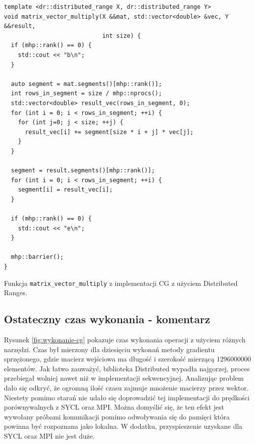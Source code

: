 \documentclass[a4paper,12pt]{book} %
\begin{document}
\begin{lstfloat}
\lstset{language=C++}
\begin{lstlisting}[frame=single]
template <dr::distributed_range X, dr::distributed_range Y>
void matrix_vector_multiply(X &&mat, std::vector<double> &vec, Y &&result,
                            int size) {
  if (mhp::rank() == 0) {
    std::cout << "b\n";
  }

  auto segment = mat.segments()[mhp::rank()];
  int rows_in_segment = size / mhp::nprocs();
  std::vector<double> result_vec(rows_in_segment, 0);
  for (int i = 0; i < rows_in_segment; ++i) {
    for (int j=0; j < size; ++j) {
      result_vec[i] += segment[size * i + j] * vec[j];
    }
  }

  segment = result.segments()[mhp::rank()];
  for (int i = 0; i < rows_in_segment; ++i) {
    segment[i] = result_vec[i];
  }

  if (mhp::rank() == 0) {
    std::cout << "e\n";
  }

  mhp::barrier();
}

\end{lstlisting}
\caption{Funkcja \texttt{matrix\_vector\_multiply} z implementacji CG z użyciem Distributed Ranges.}
\label{lst:dist-ranges-mat-vec}
\end{lstfloat}

\subsection{Ostateczny czas wykonania - komentarz}
Rysunek \ref{fig:wykonanie-cg} pokazuje czas wykonania operacji z użyciem różnych narzędzi. Czas był mierzony dla dziesięciu wykonań metody gradientu sprzężonego, gdzie macierz wejściowa ma długość i szerokość mierzącą $1296000000$ elementów. Jak łatwo zauważyć, biblioteka Distributed wypadła najgorzej, proces przebiegał wolniej nawet niż w implementacji sekwencyjnej. Analizując problem dało się odkryć, że ogromną ilość czasu zajmuje mnożenie macierzy przez wektor. Niestety pomimo starań nie udało się doprowadzić tej implementacji do prędkości porównywalnych z SYCL oraz MPI. Można domyślić się, że ten efekt jest wywołany próbami komunikacji pomimo odwoływania się do pamięci która powinna być rozpoznana jako lokalna. W dodatku, przyspieszenie uzyskane dla SYCL oraz MPI nie jest duże.
\end{document}
